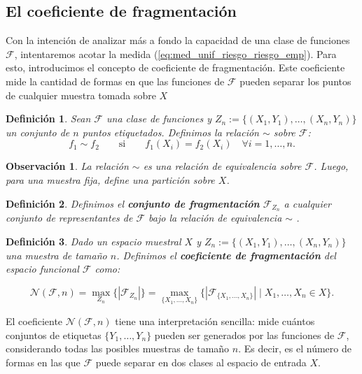 \documentclass{report}
\newtheorem{dfn}{Definición}[section]
\newtheorem{obs}{Observación}[section]
\begin{document}
\subsection{El coeficiente de fragmentación}

Con la intención de analizar más a fondo la capacidad de una clase de funciones 
\(\mathcal{F}\), intentaremos acotar la medida (\ref{eq:med_unif_riesgo_riesgo_emp}).
Para esto, introducimos el concepto de coeficiente de fragmentación.  Este coeficiente mide la 
cantidad de formas en que las funciones de \(\mathcal{F}\) pueden separar los puntos de cualquier muestra
tomada sobre $X$\newline

\begin{dfn}
    Sean \(\mathcal{F}\) una clase de funciones y \(Z_n := \{(X_1, Y_1), \dots, (X_n, Y_n)\}\) un conjunto de \(n\) puntos
    etiquetados. Definimos la relación $\sim$ sobre \(\mathcal{F}\):
        \[
        f_1 \sim f_2 \qquad \text{si} \qquad f_1(X_i) = f_2(X_i) \quad \forall i = 1, \dots, n.
        \]
\end{dfn}
\begin{obs}
    La relación \(\sim\) es una relación de equivalencia sobre \(\mathcal{F}\). Luego, para una muestra fija,
    define una partición sobre $X$.
\end{obs}
\begin{dfn}
    Definimos el \textbf{conjunto de fragmentación} \(\mathcal{F}_{Z_n}\) a cualquier conjunto de representantes de \(\mathcal{F}\)
    bajo la relación de equivalencia \(\sim\) .
\end{dfn}
\begin{dfn}
    Dado un espacio muestral $X$ y \(Z_n := \{(X_1, Y_1), \dots, (X_n, Y_n)\}\) una muestra de tamaño \(n\). Definimos el 
    \textbf{coeficiente de fragmentación} del espacio funcional $\mathcal{F}$ como:
    
    \[
    \mathcal{N}(\mathcal{F}, n) = \max_{Z_n} \{|\mathcal{F}_{Z_n}|\} = \max_{\{X_1, \dots, X_n\}}\{|\mathcal{F}_{\{X_1, \dots, X_n\}}| \mid X_1, \dots, X_n \in X\}. 
    \]
\end{dfn}

El coeficiente $\mathcal{N}(\mathcal{F}, n)$ tiene una interpretación sencilla: mide cuántos conjuntos de etiquetas 
\( \{Y_1, \dots, Y_n\} \) pueden ser generados por las funciones de \(\mathcal{F}\), considerando todas las posibles
muestras de tamaño \(n\). Es decir, es el número de formas en las que \(\mathcal{F}\) puede separar en dos clases al 
espacio de entrada $X$.\newline
\end{document}
